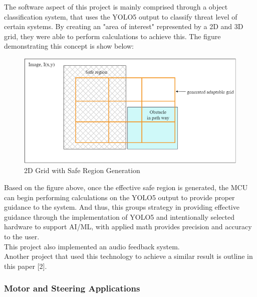 \noindent The software aspect of this project is mainly comprised through a object classification system, that uses the YOLO5 output to classify threat level of certain systems. By creating an "area of interest" represented by a 2D and 3D grid, they were able to perform calculations to achieve this. The figure demonstrating this concept is show below:
				
\begin{figure}[H]
	\centering
	\includegraphics[width=\textwidth]{./Images/Figure1_Grid_Detection.png}
	\caption{\label{fig:Grid-Generatio}2D Grid with Safe Region Generation}
\end{figure}

\noindent Based on the figure above, once the effective safe region is generated, the MCU can begin performing calculations on the YOLO5 output to provide proper guidance to the system. And thus, this groups strategy in providing effective guidance through the implementation of YOLO5 and intentionally selected hardware to support AI/ML, with  applied math provides precision and accuracy to the user. \\

\noindent This project also implemented an audio feedback system. \\

\noindent Another project that used this technology to achieve a similar result is outline in this paper [2]. \\



\subsubsection{Motor and Steering Applications} 

